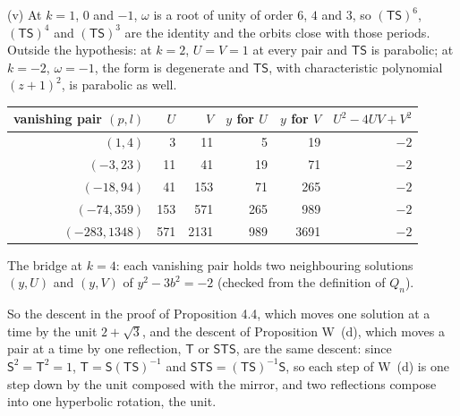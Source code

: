 \documentclass[11pt]{article}
\begin{document}
(v) At $k=1$, $0$ and $-1$, $\omega$ is a root of unity of order $6$, $4$ and $3$, so $(\mathsf{T}\mathsf{S})^6$, $(\mathsf{T}\mathsf{S})^4$ and $(\mathsf{T}\mathsf{S})^3$ are the identity and the orbits close with those periods. Outside the hypothesis: at $k=2$, $U=V=1$ at every pair and $\mathsf{T}\mathsf{S}$ is parabolic; at $k=-2$, $\omega=-1$, the form is degenerate and $\mathsf{T}\mathsf{S}$, with characteristic polynomial $(z+1)^2$, is parabolic as well.

\smallskip
\begin{center}
\small
\begin{tabular}{rrrrrr}
vanishing pair $(p,l)$ & $U$ & $V$ & $y$ for $U$ & $y$ for $V$ & $U^2-4UV+V^2$\\
\hline
$(1,4)$ & 3 & 11 & 5 & 19 & $-2$\\
$(-3,23)$ & 11 & 41 & 19 & 71 & $-2$\\
$(-18,94)$ & 41 & 153 & 71 & 265 & $-2$\\
$(-74,359)$ & 153 & 571 & 265 & 989 & $-2$\\
$(-283,1348)$ & 571 & 2131 & 989 & 3691 & $-2$\\
\end{tabular}

\smallskip
The bridge at $k=4$: each vanishing pair holds two neighbouring solutions $(y,U)$ and $(y,V)$ of $y^2-3b^2=-2$ (checked from the definition of $Q_n$).
\end{center}

So the descent in the proof of Proposition 4.4, which moves one solution at a time by the unit $2+\sqrt3$, and the descent of Proposition W~(d), which moves a pair at a time by one reflection, $\mathsf{T}$ or $\mathsf{S}\mathsf{T}\mathsf{S}$, are the same descent: since $\mathsf{S}^2=\mathsf{T}^2=1$, $\mathsf{T}=\mathsf{S}(\mathsf{T}\mathsf{S})^{-1}$ and $\mathsf{S}\mathsf{T}\mathsf{S}=(\mathsf{T}\mathsf{S})^{-1}\mathsf{S}$, so each step of W~(d) is one step down by the unit composed with the mirror, and two reflections compose into one hyperbolic rotation, the unit.
\end{document}
